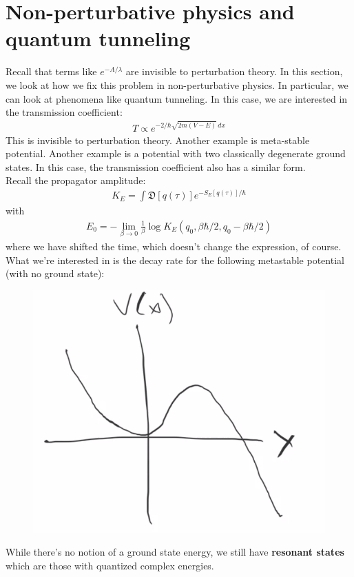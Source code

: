 \documentclass{book}
\theoremstyle{definition}
\newcommand{\be}{\beta}
\newcommand{\f}[2]{\frac{#1}{#2}}
\begin{document}
\newpage

\section{Non-perturbative physics and quantum tunneling}
Recall that terms like $e^{-A/\lambda}$ are invisible to perturbation theory. In this section, we look at how we fix this problem in non-perturbative physics. In particular, we can look at phenomena like quantum tunneling. In this case, we are interested in the transmission coefficient:
\begin{align}
T \propto e^{-2/\hbar \sqrt{2m(V-E)}\,dx}
\end{align}
This is invisible to perturbation theory. Another example is meta-stable potential. Another example is a potential with two classically degenerate ground states. In this case, the transmission coefficient also has a similar form. \\

Recall the propagator amplitude:
\begin{align}
K_E = \int \mathfrak{D}[q(\tau)]  e^{-S_E[q(\tau)]/\hbar}
\end{align}
with 
\begin{align}
E_0 = -\lim_{\beta \to 0}\f{1}{\beta}\log K_E(q_0 ,\be\hbar/2, q_0 -\beta\hbar/2)
\end{align}
where we have shifted the time, which doesn't change the expression, of course. \\

What we're interested in is the decay rate for the following metastable potential (with no ground state):
\begin{figure}[!htb]
	\centering
	\includegraphics[scale=0.4]{metastable}
\end{figure}
While there's no notion of a ground state energy, we still have \textbf{resonant states} which are those with quantized complex energies. \\
\end{document}
